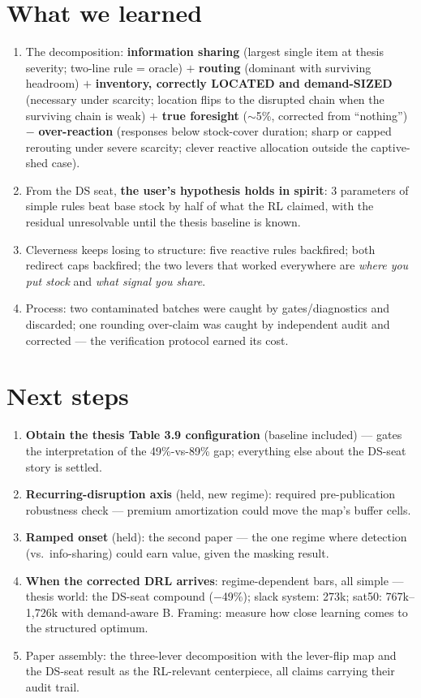 \documentclass[11pt]{article}
\begin{document}
\section{What we learned}
\begin{enumerate}
\item The decomposition: \textbf{information sharing} (largest single item at thesis
severity; two-line rule = oracle) $+$ \textbf{routing} (dominant with surviving headroom)
$+$ \textbf{inventory, correctly LOCATED and demand-SIZED} (necessary under scarcity;
location flips to the disrupted chain when the surviving chain is weak) $+$ \textbf{true
foresight} ($\sim$5\%, corrected from ``nothing'') $-$ \textbf{over-reaction} (responses
below stock-cover duration; sharp or capped rerouting under severe scarcity; clever
reactive allocation outside the captive-shed case).
\item From the DS seat, \textbf{the user's hypothesis holds in spirit}: 3 parameters of
simple rules beat base stock by half of what the RL claimed, with the residual unresolvable
until the thesis baseline is known.
\item Cleverness keeps losing to structure: five reactive rules backfired; both redirect
caps backfired; the two levers that worked everywhere are \emph{where you put stock} and
\emph{what signal you share}.
\item Process: two contaminated batches were caught by gates/diagnostics and discarded;
one rounding over-claim was caught by independent audit and corrected --- the verification
protocol earned its cost.
\end{enumerate}

\section{Next steps}
\begin{enumerate}
\item \textbf{Obtain the thesis Table 3.9 configuration} (baseline included) --- gates the
interpretation of the 49\%-vs-89\% gap; everything else about the DS-seat story is settled.
\item \textbf{Recurring-disruption axis} (held, new regime): required pre-publication
robustness check --- premium amortization could move the map's buffer cells.
\item \textbf{Ramped onset} (held): the second paper --- the one regime where detection
(vs.\ info-sharing) could earn value, given the masking result.
\item \textbf{When the corrected DRL arrives}: regime-dependent bars, all simple ---
thesis world: the DS-seat compound ($-$49\%); slack system: 273k; sat50: 767k--1,726k with
demand-aware B. Framing: measure how close learning comes to the structured optimum.
\item Paper assembly: the three-lever decomposition with the lever-flip map and the DS-seat
result as the RL-relevant centerpiece, all claims carrying their audit trail.
\end{enumerate}
\end{document}
